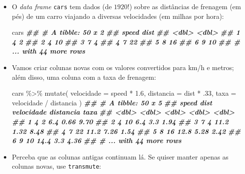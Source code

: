 \documentclass[
  11pt]{report}
\newenvironment{Shaded}{\begin{snugshade}}{\end{snugshade}}
\newcommand{\AttributeTok}[1]{\textcolor[rgb]{0.77,0.63,0.00}{#1}}
\newcommand{\DecValTok}[1]{\textcolor[rgb]{0.00,0.00,0.81}{#1}}
\newcommand{\DocumentationTok}[1]{\textcolor[rgb]{0.56,0.35,0.01}{\textbf{\textit{#1}}}}
\newcommand{\FloatTok}[1]{\textcolor[rgb]{0.00,0.00,0.81}{#1}}
\newcommand{\FunctionTok}[1]{\textcolor[rgb]{0.00,0.00,0.00}{#1}}
\newcommand{\NormalTok}[1]{#1}
\newcommand{\SpecialCharTok}[1]{\textcolor[rgb]{0.00,0.00,0.00}{#1}}
\renewenvironment{Shaded}{
    \begin{mdframed}[%
      roundcorner=2pt,%
      innerleftmargin=5pt,%
      innerrightmargin=5pt,%
      topline=true,%
      leftline=true,%
      rightline=true,%
      bottomline=true,%
      linewidth=0.5pt,%
      linecolor=black!20,%
      backgroundcolor=black!2,%
      skipabove=2ex,%
      skipbelow=2.5ex%
    ]%
  }
  {
    \end{mdframed}
  }
\begin{document}
\begin{itemize}
\item
  O \emph{data frame} \texttt{cars} tem dados (de $1920$!) sobre as distâncias de frenagem (em pés) de um carro viajando a diversas velocidades (em milhas por hora):

\begin{Shaded}
\begin{Highlighting}[]
\NormalTok{cars}
\DocumentationTok{\#\# \# A tibble: 50 x 2}
\DocumentationTok{\#\#   speed  dist}
\DocumentationTok{\#\#   \textless{}dbl\textgreater{} \textless{}dbl\textgreater{}}
\DocumentationTok{\#\# 1     4     2}
\DocumentationTok{\#\# 2     4    10}
\DocumentationTok{\#\# 3     7     4}
\DocumentationTok{\#\# 4     7    22}
\DocumentationTok{\#\# 5     8    16}
\DocumentationTok{\#\# 6     9    10}
\DocumentationTok{\#\# \# ... with 44 more rows}
\end{Highlighting}
\end{Shaded}
\item
  Vamos criar colunas novas com os valores convertidos para km/h e metros; além disso, uma coluna com a taxa de frenagem:

\begin{Shaded}
\begin{Highlighting}[]
\NormalTok{cars }\SpecialCharTok{\%\textgreater{}\%} 
  \FunctionTok{mutate}\NormalTok{(}
    \AttributeTok{velocidade =}\NormalTok{ speed }\SpecialCharTok{*} \FloatTok{1.6}\NormalTok{,}
    \AttributeTok{distancia =}\NormalTok{ dist }\SpecialCharTok{*}\NormalTok{ .}\DecValTok{33}\NormalTok{,}
    \AttributeTok{taxa =}\NormalTok{ velocidade }\SpecialCharTok{/}\NormalTok{ distancia}
\NormalTok{  )}
\DocumentationTok{\#\# \# A tibble: 50 x 5}
\DocumentationTok{\#\#   speed  dist velocidade distancia  taxa}
\DocumentationTok{\#\#   \textless{}dbl\textgreater{} \textless{}dbl\textgreater{}      \textless{}dbl\textgreater{}     \textless{}dbl\textgreater{} \textless{}dbl\textgreater{}}
\DocumentationTok{\#\# 1     4     2        6.4      0.66  9.70}
\DocumentationTok{\#\# 2     4    10        6.4      3.3   1.94}
\DocumentationTok{\#\# 3     7     4       11.2      1.32  8.48}
\DocumentationTok{\#\# 4     7    22       11.2      7.26  1.54}
\DocumentationTok{\#\# 5     8    16       12.8      5.28  2.42}
\DocumentationTok{\#\# 6     9    10       14.4      3.3   4.36}
\DocumentationTok{\#\# \# ... with 44 more rows}
\end{Highlighting}
\end{Shaded}
\item
  Perceba que as colunas antigas continuam lá. Se quiser manter apenas as colunas novas, use \texttt{transmute}:


\end{itemize}
\end{document}
